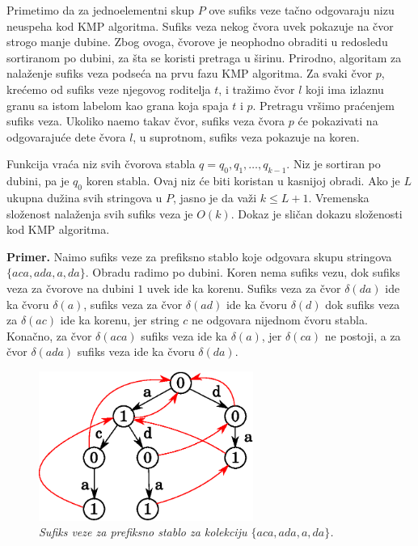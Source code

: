 Primetimo da za jednoelementni skup $P$ ove sufiks veze ta\v cno odgovaraju nizu neuspeha kod KMP algoritma. Sufiks veza nekog \v cvora uvek pokazuje na \v cvor strogo manje dubine. Zbog ovoga, \v cvorove je neophodno obraditi u redosledu sortiranom po dubini, za \v sta se koristi pretraga u \v sirinu. Prirodno, algoritam za nala\v zenje sufiks veza podse\' ca na prvu fazu KMP algoritma. Za svaki \v cvor $p$, kre\' cemo od sufiks veze njegovog roditelja $t$, i tra\v zimo \v cvor $l$ koji ima izlaznu granu sa istom labelom kao grana koja spaja $t$ i $p$. Pretragu vr\v simo pra\' cenjem sufiks veza. Ukoliko na\dj emo takav \v cvor, sufiks veza \v cvora $p$ \' ce pokazivati na odgovaraju\' ce dete \v cvora $l$, u suprotnom, sufiks veza pokazuje na koren.

\noindent
\begin{minipage}[l]{\textwidth}

\end{minipage}

Funkcija vra\' ca niz svih \v cvorova stabla $q = q_0, q_1, \ldots, q_{k-1}$. Niz je sortiran po dubini, pa je $q_0$ koren stabla. Ovaj niz \' ce biti koristan u kasnijoj obradi. Ako je $L$ ukupna du\v zina svih stringova u $P$, jasno je da va\v zi $k \leq L+1$. Vremenska slo\v zenost nala\v zenja svih sufiks veza je $O(k)$\cite{ahorad}. Dokaz je sli\v can dokazu slo\v zenosti kod KMP algoritma.

\noindent \textbf{Primer.} Na\dj imo sufiks veze za prefiksno stablo koje odgovara skupu stringova $\{aca,ada,a,da\}$. Obradu radimo po dubini. Koren nema sufiks vezu, dok sufiks veza za \v cvorove na dubini $1$ uvek ide ka korenu. Sufiks veza za \v cvor $\delta(da)$ ide ka \v cvoru $\delta(a)$, sufiks veza za \v cvor $\delta(ad)$ ide ka \v cvoru $\delta(d)$ dok sufiks veza za $\delta(ac)$ ide ka korenu, jer string $c$ ne odgovara nijednom \v cvoru stabla. Kona\v cno, za \v cvor $\delta(aca)$ sufiks veza ide ka $\delta(a)$, jer $\delta(ca)$ ne postoji, a za \v cvor $\delta(ada)$ sufiks veza ide ka \v cvoru $\delta(da)$.

\begin{figure}[H]
    \centering
    \includegraphics[width=70mm]{../img/aho1.eps}
    \caption*{\textit{Sufiks veze za prefiksno stablo za kolekciju $\{aca,ada,a,da\}$.}}
\end{figure}

